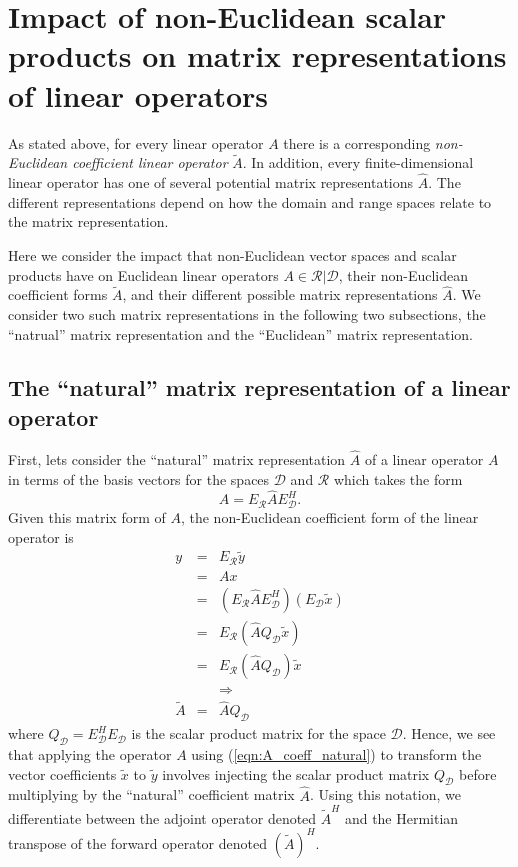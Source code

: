 \documentclass[pdf,ps2pdf,11pt]{SANDreport}
\begin{document}
\section{Impact of non-Euclidean scalar products on matrix representations of linear operators}
\label{sec:matrix_representations_of_linear_operators}

As stated above, for every linear operator $A$ there is a corresponding
{}\textit{non-Euclidean coefficient linear operator} $\tilde{A}$.  In
addition, every finite-dimensional linear operator has one of several
potential matrix representations $\hat{A}$.  The different representations
depend on how the domain and range spaces relate to the matrix representation.

Here we consider the impact that non-Euclidean vector spaces and scalar
products have on Euclidean linear operators $A\in\mathcal{R}|\mathcal{D}$,
their non-Euclidean coefficient forms $\tilde{A}$, and their different
possible matrix representations $\hat{A}$.  We consider two such matrix
representations in the following two subsections, the ``natrual'' matrix
representation and the ``Euclidean'' matrix representation.

\subsection{The ``natural'' matrix representation of a linear operator}

First, lets consider the ``natural'' matrix representation $\hat{A}$ of a
linear operator $A$ in terms of the basis vectors for the spaces $\mathcal{D}$
and $\mathcal{R}$ which takes the form
%
\begin{equation}
A = E_{\mathcal{R}} \hat{A} E_{\mathcal{D}}^H.
\label{eqn:A_coeff_natural}
\end{equation}
%
Given this matrix form of $A$, the non-Euclidean coefficient form of the
linear operator is
%
\begin{eqnarray}
y
& = & E_{\mathcal{R}} \tilde{y} \nonumber \\
& = & A x \nonumber \\
& = & ( E_{\mathcal{R}} \hat{A} E_{\mathcal{D}}^H ) ( E_{\mathcal{D}} \tilde{x} ) \nonumber \\
& = & E_{\mathcal{R}} ( \hat{A} Q_{\mathcal{D}} \tilde{x} ) \nonumber \\
& = & E_{\mathcal{R}} ( \hat{A} Q_{\mathcal{D}} ) \tilde{x} \nonumber \\
&  & \Rightarrow \nonumber \\
\tilde{A} & = & \hat{A} Q_{\mathcal{D}}
\label{eqn:A_natural_apply}
\end{eqnarray}
%
where $Q_{\mathcal{D}} = E_{\mathcal{D}}^H E_{\mathcal{D}}$ is the scalar
product matrix for the space $\mathcal{D}$.  Hence, we see that applying the
operator $A$ using (\ref{eqn:A_coeff_natural}) to transform the vector
coefficients $\tilde{x}$ to $\tilde{y}$ involves injecting the scalar product
matrix $Q_{\mathcal{D}}$ before multiplying by the ``natural'' coefficient
matrix $\hat{A}$.  Using this notation, we differentiate between the adjoint
operator denoted $\tilde{A}^H$ and the Hermitian transpose of the forward
operator denoted $(\tilde{A})^H$.
\end{document}

